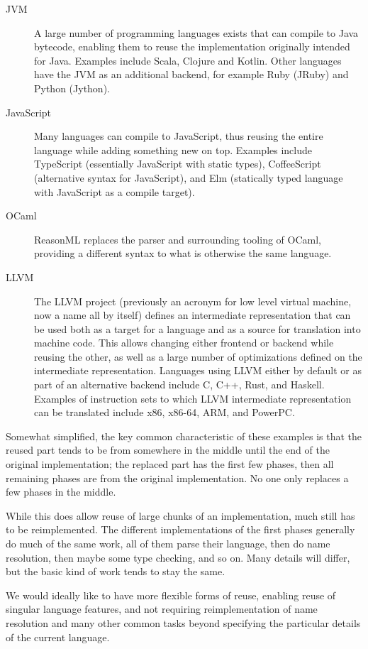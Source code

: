 \documentclass{kththesis}
\begin{document}
\begin{description}
  \item[JVM] A large number of programming languages exists that can compile to Java bytecode, enabling them to reuse the implementation originally intended for Java. Examples include Scala, Clojure and Kotlin. Other languages have the JVM as an additional backend, for example Ruby (JRuby) and Python (Jython). %
  \item[JavaScript] Many languages can compile to JavaScript, thus reusing the entire language while adding something new on top. Examples include TypeScript (essentially JavaScript with static types), CoffeeScript (alternative syntax for JavaScript), and Elm (statically typed language with JavaScript as a compile target).
  \item[OCaml] ReasonML replaces the parser and surrounding tooling of OCaml, providing a different syntax to what is otherwise the same language.
  \item[LLVM] The LLVM project (previously an acronym for low level virtual machine, now a name all by itself) defines an intermediate representation that can be used both as a target for a language and as a source for translation into machine code. This allows changing either frontend or backend while reusing the other, as well as a large number of optimizations defined on the intermediate representation. Languages using LLVM either by default or as part of an alternative backend include C, C++, Rust, and Haskell. Examples of instruction sets to which LLVM intermediate representation can be translated include x86, x86-64, ARM, and PowerPC.
\end{description}

Somewhat simplified, the key common characteristic of these examples is that the reused part tends to be from somewhere in the middle until the end of the original implementation; the replaced part has the first few phases, then all remaining phases are from the original implementation. No one only replaces a few phases in the middle.

While this does allow reuse of large chunks of an implementation, much still has to be reimplemented. The different implementations of the first phases generally do much of the same work, all of them parse their language, then do name resolution, then maybe some type checking, and so on. Many details will differ, but the basic kind of work tends to stay the same.

We would ideally like to have more flexible forms of reuse, enabling reuse of singular language features, and not requiring reimplementation of name resolution and many other common tasks beyond specifying the particular details of the current language.
\end{document}
